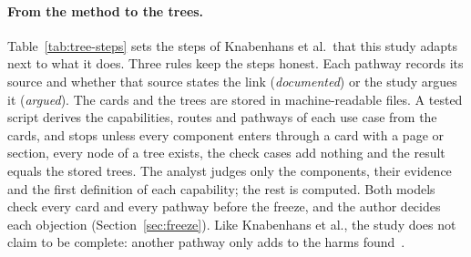 \paragraph{From the method to the trees.} Table~\ref{tab:tree-steps} sets the steps of
Knabenhans et al.\ that this study adapts next to what it does. Three rules keep the steps honest.
Each pathway records its source and whether that source states the link
(\emph{documented}) or the study argues it (\emph{argued}). The cards and the trees are stored
in machine-readable files. A tested script derives the capabilities, routes and pathways of each
use case from the cards, and stops unless every component enters through a card with a page or
section, every node of a tree exists, the check cases add nothing and the result equals the
stored trees. The analyst judges only the components, their evidence and the first definition
of each capability; the rest is computed. Both models check every card and every pathway
before the freeze, and the author decides each objection (Section~\ref{sec:freeze}).
Like Knabenhans et al., the study does not claim to be complete: another pathway only
adds to the harms found~\parencite[\S4.1]{knabenhans2026harms}.

